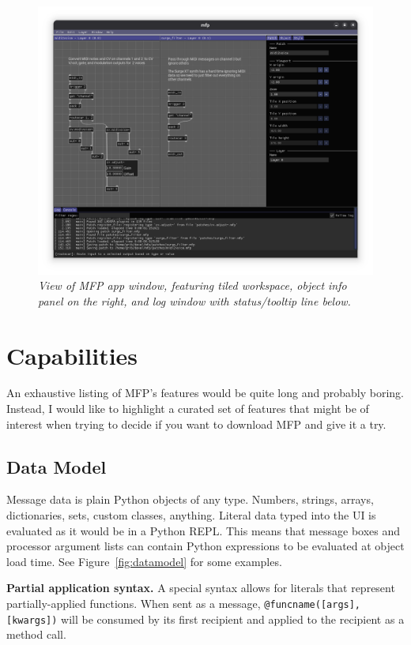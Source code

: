 \documentclass[a4paper]{article}
\begin{document}
\begin{figure}[ht]
\centerline{\includegraphics[width=6in]{appview.png}}
\caption{\label{fig:appview}{
    \it View of MFP app window, featuring tiled workspace,
    object info panel on the right, and log window with
    status/tooltip line below.
}}
\end{figure}


\section{Capabilities}

An exhaustive listing of MFP's features would be quite long and
probably boring. Instead, I would like to highlight a curated set
of features that might be of interest when trying to decide if
you want to download MFP and give it a try.

\subsection{Data Model}

Message data is plain Python objects of any type. Numbers,
strings, arrays, dictionaries, sets, custom classes, anything.
Literal data typed into the UI is evaluated as it would be in a
Python REPL. This means that message boxes and processor argument
lists can contain Python expressions to be evaluated at object
load time. See Figure~\ref{fig:datamodel} for some examples.

{\bf Partial application syntax.} A special syntax allows for
literals that represent partially-applied functions. When sent as
a message, {\tt @funcname([args], [kwargs])} will be consumed by its
first recipient and applied to the recipient as a method call.
\end{document}
